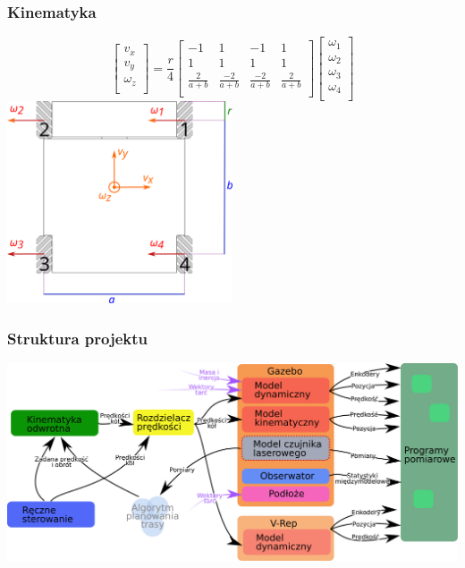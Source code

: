 \documentclass{beamer}
\begin{document}
	\begin{frame}
		\frametitle{Kinematyka}
		\[
		\begin{bmatrix}
		v_x \\
		v_y \\
		\omega_z \\
		\end{bmatrix}
		=
		\frac{r}{4}
		\begin{bmatrix}
		-1 & 1 & -1 & 1 \\
		1 & 1 & 1 & 1 \\
		\frac{2}{a+b} & \frac{-2}{a+b} & \frac{-2}{a+b} & \frac{2}{a+b} \\
		\end{bmatrix}
		\begin{bmatrix}
		\omega_1 \\
		\omega_2 \\
		\omega_3 \\
		\omega_4 \\
		\end{bmatrix}
		\]
		\centering
		\includegraphics[width=0.5\textwidth]{graphics/base_dims.pdf} 
	\end{frame}

	\begin{frame}
		\frametitle{Struktura projektu}
		\centering
		\includegraphics[width=\textwidth]{graphics/comm.pdf} 
	\end{frame}
	
\end{document}
